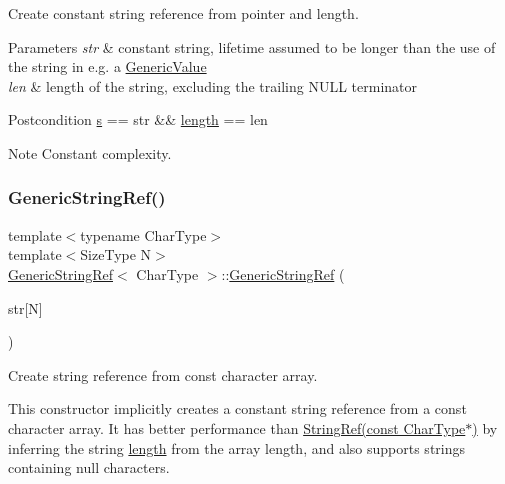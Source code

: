 Create constant string reference from pointer and length. 


\begin{DoxyParams}{Parameters}
{\em str} & constant string, lifetime assumed to be longer than the use of the string in e.\+g. a \hyperlink{classGenericValue}{Generic\+Value} \\
\hline
{\em len} & length of the string, excluding the trailing N\+U\+LL terminator\\
\hline
\end{DoxyParams}
\begin{DoxyPostcond}{Postcondition}
\hyperlink{structGenericStringRef_aec7a5900ea6f3e42f0ea8403d5135103}{s} == str \&\& \hyperlink{structGenericStringRef_a4a96d618744ad73f766a1551b1d517fe}{length} == len 
\end{DoxyPostcond}
\begin{DoxyNote}{Note}
Constant complexity. 
\end{DoxyNote}
\mbox{\label{structGenericStringRef_aae0c070f914d2486a560150a927c22dc}} 
\subsubsection{\texorpdfstring{Generic\+String\+Ref()}{GenericStringRef()}\hspace{0.1cm}{\footnotesize\ttfamily [4/6]}}
{\footnotesize\ttfamily template$<$typename Char\+Type$>$ \\
template$<$Size\+Type N$>$ \\
\hyperlink{structGenericStringRef}{Generic\+String\+Ref}$<$ Char\+Type $>$\+::\hyperlink{structGenericStringRef}{Generic\+String\+Ref} (\begin{DoxyParamCaption}\item[{const Char\+Type(\&)}]{str\mbox{[}\+N\mbox{]} }\end{DoxyParamCaption})\hspace{0.3cm}{\ttfamily [inline]}}



Create string reference from {\ttfamily const} character array. 

This constructor implicitly creates a constant string reference from a {\ttfamily const} character array. It has better performance than \hyperlink{structGenericStringRef_aa6b9fd9f6aa49405a574c362ba9af6b5}{String\+Ref(const Char\+Type$\ast$)} by inferring the string \hyperlink{structGenericStringRef_a4a96d618744ad73f766a1551b1d517fe}{length} from the array length, and also supports strings containing null characters.


